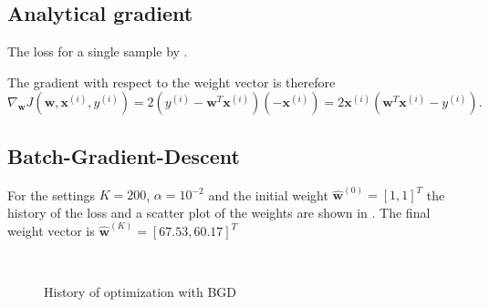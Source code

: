 \documentclass[12pt,a4paper]{scrartcl}
\newcommand{\matr}[1]{\mathbf{#1}}
\begin{document}
	\subsection*{Analytical gradient}
	
	The loss for a single sample by .
	
	The gradient with respect to the weight vector is therefore
	\begin{equation}
		\nabla_\matr{w} J\left(\matr{w}, \matr{x}^{(i)}, y^{(i)}\right) = 2\left(y^{(i)} - \matr{w}^T\matr{x}^{(i)} \right)\left(-\matr{x}^{(i)}\right) = 2\matr{x}^{(i)}\left(\matr{w}^T\matr{x}^{(i)} - y^{(i)}\right).
	\end{equation}
	
	\subsection*{Batch-Gradient-Descent}
	
	For the settings $K=200$, $\alpha = 10^{-2}$ and the initial weight $\matr{\hat{w}}^{(0)} = [1, 1]^T$ the history of the loss and a scatter plot of the weights are shown in .
	The final weight vector is $\matr{\hat{w}}^{(K)} = [67.53, 60.17]^T$
	
	\begin{figure}[H]
		\centering	
		\\
		\caption{History of optimization with BGD}
		\label{fig:ex3_1_bgd}
	\end{figure}
	
\end{document}
